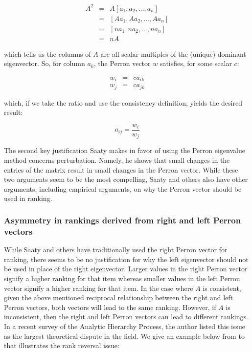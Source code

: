 \documentclass[a4,11pt,twoside,leqno]{report}
\theoremstyle{definition}
\theoremstyle{remark}
\numberwithin{equation}{section}
\begin{document}
$$\begin{array}{lcl} A^2&=&A[a_1,a_2,\dots,a_n] \\ &=&[Aa_1,Aa_2,\dots,Aa_n] \\ &=& [na_1,na_2,\dots,na_n] \\ &=& nA\end{array}$$

which tells us the columns of $A$ are all scalar multiples of the (unique) dominant eigenvector. So, for column $a_k$, the Perron vector $w$ satisfies, for some scalar $c$:

$$\begin{array}{lcl}w_i&=&ca_{ik}\\ w_j&=&ca_{jk} \end{array}$$

which, if we take the ratio and use the consistency definition, yields the desired result: 

$$a_{ij}=\frac{w_i}{w_j}$$

The second key justification Saaty makes in favor of using the Perron eigenvalue method concerns perturbation. Namely, he shows that small changes in the entries of the matrix result in small changes in the Perron vector. While these two arguments seem to be the most compelling, Saaty and others also have other arguments, including empirical arguments, on why the Perron vector should be used in ranking. 

\subsubsection{Asymmetry in rankings derived from right and left Perron vectors}

While Saaty and others have traditionally used the right Perron vector for ranking, there seems to be no justification for why the left eigenvector should not be used in place of the right eigenvector. Larger values in the right Perron vector signify a higher ranking for that item whereas smaller values in the left Perron vector signify a higher ranking for that item. In the case where $A$ is consistent, given the above mentioned reciprocal relationship between the right and left Perron vectors, both vectors will lead to the same ranking. However, if $A$ is inconsistent, then the right and left Perron vectors can lead to different rankings. In a recent survey of the Analytic Hierarchy Process, the author listed this issue as the largest theoretical dispute in the field. We give an example below from \cite{johnson} to that illustrates the rank reversal issue:
\end{document}
